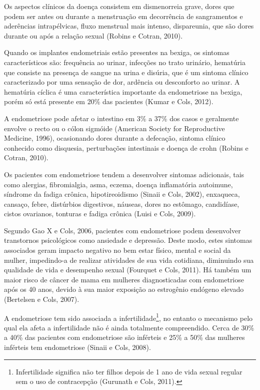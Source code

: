 \documentclass[12pt]{article} %
\begin{document}
Os aspectos clínicos da doença consistem em dismenorreia grave, dores que podem ser antes ou durante a menstruação em decorrência de sangramentos e aderências intrapélvicas, fluxo menstrual mais intenso,
dispareunia, que são dores durante ou após a relação sexual (Robins e Cotran, 2010).

Quando os implantes endometriais estão presentes na bexiga, os sintomas característicos são: frequência ao urinar, infecções no trato urinário, hematúria que consiste na presença de sangue na urina e disúria, que é um sintoma clínico caracterizado por uma sensação de dor, ardência ou desconforto ao urinar.  A hematúria cíclica
é uma característica importante da endometriose na bexiga, porém só
está presente em 20\% das pacientes (Kumar e Cols, 2012). 

A endometriose pode afetar o intestino em 3\% a 37\% dos
casos e geralmente envolve o recto ou o cólon sigmóide (American Society for Reproductive Medicine, 1996), ocasionando dores durante a defecação, sintoma clínico conhecido como disquesia, perturbações intestinais e doença de crohn (Robins e Cotran, 2010).

Os pacientes com endometriose tendem a desenvolver sintomas
adicionais, tais como alergias, fibromialgia, asma, eczema, doença
inflamatória autoimune, síndrome da fadiga crônica, hipotireoidismo
(Sinaii e Cols, 2002), enxaqueca, cansaço, febre, distúrbios digestivos, náuseas, dores no estômago,
candidíase, cistos ovarianos, tonturas e fadiga crônica (Luisi e Cols, 2009).


Segundo Gao X e Cols, 2006, pacientes com endometriose podem
desenvolver transtornos psicológicos como ansiedade e depressão.
Deste modo, estes sintomas associados geram impacto negativo no bem estar físico, mental e social da mulher, impedindo-a de realizar
atividades de sua vida cotidiana, diminuindo sua qualidade de vida e
desempenho sexual (Fourquet e Cols, 2011). Há também um maior risco de câncer de mama em mulheres diagnosticadas
com endometriose após os 40 anos, devido à sua maior exposição ao
estrogênio endógeno elevado (Bertelsen e Cols, 2007).


A endometriose tem sido associada a infertilidade\footnote{Infertilidade significa não ter filhos depois de 1 ano de vida sexual regular sem o uso de contracepção (Gurunath e Cols, 2011).}, no entanto o mecanismo pelo qual ela afeta a infertilidade não é ainda totalmente compreendido. Cerca de 30\% a 40\% das pacientes com endometriose são inférteis e 25\% a 50\% das mulheres inférteis tem endometriose (Sinaii e Cols, 2008).
\end{document}
